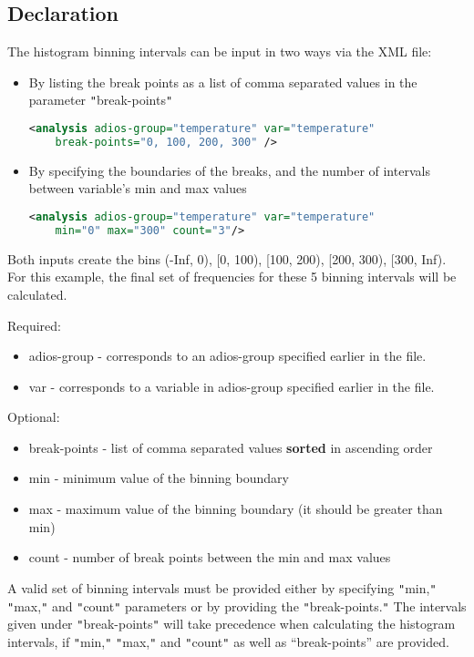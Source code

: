 \subsection{Declaration}
The histogram binning intervals can be input in two ways via the XML file:
\begin{itemize}
\item By listing the break points as a list of comma separated values 
in the parameter \texttt{"}break-points\texttt{"} 
\begin{lstlisting}[language=XML]
<analysis adios-group="temperature" var="temperature"
    break-points="0, 100, 200, 300" />
\end{lstlisting}

\item By specifying the boundaries of the breaks, and the number 
of intervals between variable's min and max values
\begin{lstlisting}[language=XML]
<analysis adios-group="temperature" var="temperature"
    min="0" max="300" count="3"/>
\end{lstlisting}
\end{itemize}

Both inputs create the bins (-Inf, 0), [0, 100), [100, 200), [200, 300), [300, 
Inf). For this example, the final set of frequencies for these 5 binning intervals 
will be calculated.

Required:
\begin{itemize}
\item adios-group - corresponds to an adios-group specified earlier in the file.
\item var - corresponds to a variable in adios-group specified earlier in the file.
\end{itemize}

Optional:
\begin{itemize}
\item break-points - list of comma separated values \textbf{sorted} in ascending order
\item min  - minimum value of the binning boundary
\item max - maximum value of the binning boundary 
(it should be greater than min)
\item count - number of break points between the min and max values 
\end{itemize}

A valid set of binning intervals must be provided either by specifying \texttt{"}min,\texttt{"} 
\texttt{"}max,\texttt{"} and \texttt{"}count\texttt{"} parameters or by providing 
the \texttt{"}break-points.\texttt{"} The intervals given under \texttt{"}break-points\texttt{"} 
will take precedence when calculating the histogram intervals, if \texttt{"}min,\texttt{"} 
\texttt{"}max,\texttt{"} and \texttt{"}count\texttt{"} as well as ``break-points'' 
are provided.

